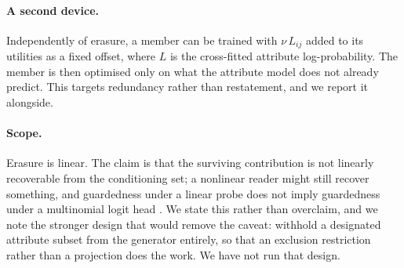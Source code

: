 \paragraph{A second device.} Independently of erasure, a member can be trained with
$\nu\,L_{ij}$ added to its utilities as a fixed offset, where $L$ is the cross-fitted attribute
log-probability. The member is then optimised only on what the attribute model does not
already predict. This targets redundancy rather than restatement, and we report it alongside.

\paragraph{Scope.} Erasure is linear. The claim is that the surviving contribution is not
linearly recoverable from the conditioning set; a nonlinear reader might still recover
something, and guardedness under a linear probe does not imply guardedness under a multinomial
logit head \citep{ravfogel2023loglinear}. We state this rather than overclaim, and we note the
stronger design that would remove the caveat: withhold a designated attribute subset from the
generator entirely, so that an exclusion restriction rather than a projection does the work. We
have not run that design.
